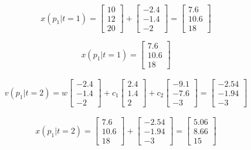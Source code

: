 \documentclass{minimal}
\begin{document}
	\[x(p_1|t=1) = \begin{bmatrix} 10 \\ 12 \\ 20	\end{bmatrix} + \begin{bmatrix} -2.4 \\-1.4 \\ -2	\end{bmatrix} = \begin{bmatrix} 7.6 \\ 10.6 \\ 18 \end{bmatrix} \]
	
	\vspace{3em}
	
	\[x(p_1|t=1) = \begin{bmatrix} 7.6 \\ 10.6 \\ 18 \end{bmatrix} \]
	
	\begin{align*}
		v(p_1|t=2) = w \begin{bmatrix} -2.4 \\-1.4 \\ -2 \end{bmatrix}
		+c_1 \begin{bmatrix} 2.4 \\ 1.4 \\ 2 \end{bmatrix}
		+c_2\begin{bmatrix} -9.1 \\ -7.6 \\ -3 \end{bmatrix}
		= \begin{bmatrix} -2.54 \\-1.94 \\ -3	\end{bmatrix}
	\end{align*}
	
	\[x(p_1|t=2) = \begin{bmatrix} 7.6 \\ 10.6 \\ 18 \end{bmatrix} + \begin{bmatrix} -2.54 \\-1.94 \\ -3 \end{bmatrix} = \begin{bmatrix} 5.06 \\ 8.66 \\ 15 \end{bmatrix} \]
	
\end{document}
